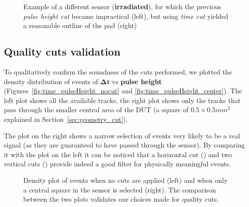 \begin{figure}[ht]
    \centering
    \hfill
    \centering
    \captionsetup{width=\captionwidth}
    \caption{Example of a different sensor (\textbf{irradiated}), for which the previous \textit{pulse height cut} became impractical (left), but using \textit{time cut} yielded a reasonable outline of the pad (right)}
\end{figure}

\subsection{Quality cuts validation}

To qualitatively confirm the soundness of the cuts performed, we plotted the density distribution of events of \(\boldsymbol{\Delta t}\) vs \textbf{pulse height} (Figures~\ref{fig:time_pulseHeight_nocut} and \ref{fig:time_pulseHeight_center}). The left plot shows all the available tracks, the right plot shows only the tracks that pass through the smaller central area of the DUT (a square of \(0.5\times0.5\si{mm^2}\) explained in Section~\ref{sec:geometry_cut}).

The plot on the right shows a narrow selection of events very likely to be a real signal (as they are guaranteed to have passed through the sensor). By comparing it with the plot on the left it can be noticed that a horizontal cut () and two vertical cuts () provide indeed a good filter for physically meaningful events. 


\begin{figure}[h!tbp]
    \centering
    \hfill
    \centering
    \captionsetup{width=\captionwidth}
        \caption{Density plot of events when no cuts are applied (left) and when only a central square in the sensor is selected (right). The comparison between the two plots validates our choices made for quality cuts.}
\end{figure}


